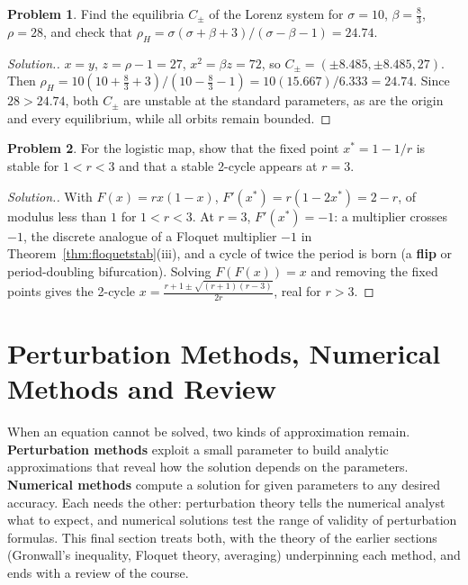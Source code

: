 \documentclass[11pt,a4paper]{article}
\numberwithin{equation}{section}
\theoremstyle{definition}
\newtheorem{problemx}{Problem}[subsection]
\newenvironment{problem}{\begin{problemx}}{\end{problemx}}
\newenvironment{solution}
  {\renewcommand{\qedsymbol}{}\begin{proof}[\textit{Solution}.]}
  {\end{proof}}
\begin{document}
\begin{problem}
Find the equilibria $C_\pm$ of the Lorenz system for $\sigma = 10$, $\beta = \frac83$, $\rho = 28$, and check that $\rho_H = \sigma(\sigma + \beta + 3)/(\sigma - \beta - 1) = 24.74$.
\end{problem}

\begin{solution}
$x = y$, $z = \rho - 1 = 27$, $x^2 = \beta z = 72$, so $C_\pm = (\pm8.485, \pm8.485, 27)$. Then $\rho_H = 10(10 + \frac83 + 3)/(10 - \frac83 - 1) = 10(15.667)/6.333 = 24.74$. Since $28 > 24.74$, both $C_\pm$ are unstable at the standard
parameters, as are the origin and every equilibrium, while all orbits remain bounded.
\end{solution}

\begin{problem}
For the logistic map, show that the fixed point $x^* = 1 - 1/r$ is stable for $1 < r < 3$ and that a stable 2-cycle appears at $r = 3$.
\end{problem}

\begin{solution}
With $F(x) = rx(1 - x)$, $F'(x^*) = r(1 - 2x^*) = 2 - r$, of modulus less than $1$ for $1 < r < 3$. At $r = 3$, $F'(x^*) = -1$: a multiplier crosses $-1$, the discrete analogue of a Floquet multiplier $-1$ in
Theorem~\ref{thm:floquetstab}(iii), and a cycle of twice the period is born (a \textbf{flip} or period-doubling bifurcation). Solving $F(F(x)) = x$ and removing the fixed points gives the 2-cycle
$x = \frac{r + 1 \pm \sqrt{(r + 1)(r - 3)}}{2r}$, real for $r > 3$.
\end{solution}

\section{Perturbation Methods, Numerical Methods and Review}
\label{sec:perturb}

When an equation cannot be solved, two kinds of approximation remain. \textbf{Perturbation methods} exploit a small parameter to build analytic
approximations that reveal how the solution depends on the parameters. \textbf{Numerical methods} compute a solution for given parameters to any desired
accuracy. Each needs the other: perturbation theory tells the numerical analyst what to expect, and numerical solutions test the range of validity of
perturbation formulas. This final section treats both, with the theory of the earlier sections (Gronwall's inequality, Floquet theory, averaging)
underpinning each method, and ends with a review of the course.
\end{document}

